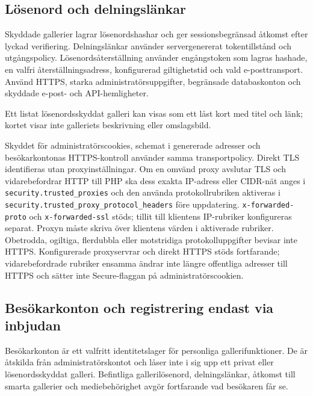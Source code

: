 \documentclass[11pt,a4paper]{article}
\newcommand{\codeword}[1]{\nolinkurl{#1}}
\begin{document}
\subsection{Lösenord och delningslänkar}

Skyddade gallerier lagrar lösenordshashar och ger sessionsbegränsad åtkomst
efter lyckad verifiering. Delningslänkar använder servergenererat tokentillstånd
och utgångspolicy. Lösenordsåterställning använder engångstoken som lagras
hashade, en valfri återställningsadress, konfigurerad giltighetstid och vald
e-posttransport. Använd HTTPS, starka administratörsuppgifter, begränsade
databaskonton och skyddade e-post- och API-hemligheter.

Ett listat lösenordsskyddat galleri kan visas som ett låst kort med titel och
länk; kortet visar inte galleriets beskrivning eller omslagsbild.

Skyddet för administratörscookies, schemat i genererade adresser och
besökarkontonas HTTPS-kontroll använder samma transportpolicy. Direkt TLS
identifieras utan proxyinställningar. Om en omvänd proxy avslutar TLS och
vidarebefordrar HTTP till PHP ska dess exakta IP-adress eller CIDR-nät anges i
\codeword{security.trusted_proxies} och den använda protokollrubriken aktiveras
i \codeword{security.trusted_proxy_protocol_headers} före uppdatering.
\codeword{x-forwarded-proto} och \codeword{x-forwarded-ssl} stöds; tillit till
klientens IP-rubriker konfigureras separat. Proxyn måste skriva över klientens
värden i aktiverade rubriker. Obetrodda, ogiltiga, flerdubbla eller motstridiga
protokolluppgifter bevisar inte HTTPS. Konfigurerade proxyservrar och direkt
HTTPS stöds fortfarande; vidarebefordrade rubriker ensamma ändrar inte längre
offentliga adresser till HTTPS och sätter inte Secure-flaggan på
administratörscookien.

\subsection{Besökarkonton och registrering endast via inbjudan}

Besökarkonton är ett valfritt identitetslager för personliga gallerifunktioner.
De är åtskilda från administratörskontot och låser inte i sig upp ett privat
eller lösenordsskyddat galleri. Befintliga gallerilösenord, delningslänkar,
åtkomst till smarta gallerier och mediebehörighet avgör fortfarande vad
besökaren får se.
\end{document}
